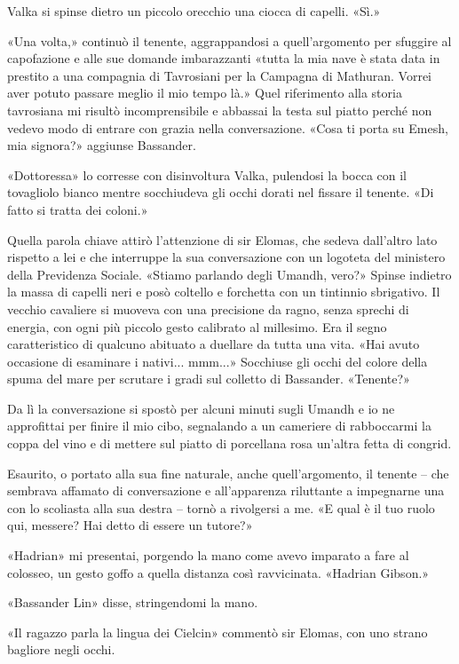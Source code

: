 Valka si spinse dietro un piccolo orecchio una ciocca di capelli. «Sì.»

«Una volta,» continuò il tenente, aggrappandosi a quell'argomento per
sfuggire al capofazione e alle sue domande imbarazzanti «tutta la mia
nave è stata data in prestito a una compagnia di Tavrosiani per la
Campagna di Mathuran. Vorrei aver potuto passare meglio il mio tempo
là.» Quel riferimento alla storia tavrosiana mi risultò incomprensibile
e abbassai la testa sul piatto perché non vedevo modo di entrare con
grazia nella conversazione. «Cosa ti porta su Emesh, mia signora?»
aggiunse {Bassander}.

«Dottoressa» lo corresse con disinvoltura Valka, pulendosi la bocca con
il tovagliolo bianco mentre socchiudeva gli occhi dorati nel fissare il
tenente. «Di fatto si tratta dei coloni.»

Quella parola chiave attirò l'attenzione di sir Elomas, che sedeva
dall'altro lato rispetto a lei e che interruppe la sua conversazione con
un logoteta del ministero della Previdenza Sociale. «Stiamo parlando
degli Umandh, vero?» Spinse indietro la massa di capelli neri e posò
coltello e forchetta con un tintinnio sbrigativo. Il vecchio cavaliere
si muoveva con una precisione da ragno, senza sprechi di energia, con
ogni più piccolo gesto calibrato al millesimo. Era il segno
caratteristico di qualcuno abituato a duellare da tutta una vita. «Hai
avuto occasione di esaminare i nativi... mmm...» Socchiuse gli occhi del
colore della spuma del mare per scrutare i gradi sul colletto di
Bassander. «Tenente?»

Da lì la conversazione si spostò per alcuni minuti sugli Umandh e io ne
approfittai per finire il mio cibo, segnalando a un cameriere di
rabboccarmi la coppa del vino e di mettere sul piatto di porcellana rosa
un'altra fetta di congrid.

Esaurito, o portato alla sua fine naturale, anche quell'argomento, il
tenente -- che sembrava affamato di conversazione e all'apparenza
riluttante a impegnarne una con lo scoliasta alla sua destra -- tornò a
rivolgersi a me. «E qual è il tuo ruolo qui, messere? Hai detto di
essere un tutore?»

«Hadrian» mi presentai, porgendo la mano come avevo imparato a fare al
colosseo, un gesto goffo a quella distanza così ravvicinata. «Hadrian
Gibson.»

«Bassander Lin» disse, stringendomi la mano.

«Il ragazzo parla la lingua dei Cielcin» commentò sir Elomas, con uno
strano bagliore negli occhi.

